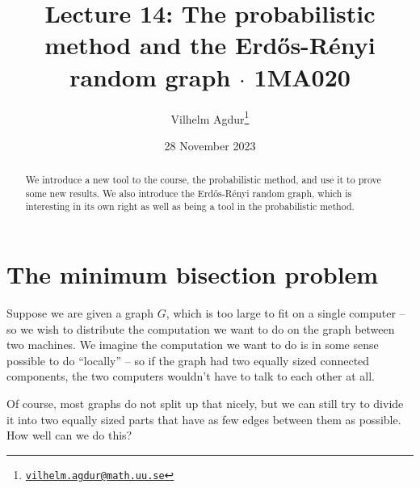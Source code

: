 \documentclass[nobib]{tufte-handout}
\title{Lecture 14: The probabilistic method and the Erd\H{o}s-Rényi random graph $\cdot$ 1MA020}
\author[Vilhelm Agdur]{Vilhelm Agdur\thanks{\href{mailto:vilhelm.agdur@math.uu.se}{\nolinkurl{vilhelm.agdur@math.uu.se}}}}
\date{28 November 2023}
\begin{document}
\maketitle%

\begin{abstract}
\noindent
We introduce a new tool to the course, the probabilistic method, and use it to prove some new results. We also introduce the Erd\H{o}s-Rényi random graph, which is interesting in its own right as well as being a tool in the probabilistic method.
\end{abstract}

\section{The minimum bisection problem}

Suppose we are given a graph $G$, which is too large to fit on a single computer -- so we wish to distribute the computation we want to do on the graph between two machines. We imagine the computation we want to do is in some sense possible to do ``locally'' -- so if the graph had two equally sized connected components, the two computers wouldn't have to talk to each other at all.

Of course, most graphs do not split up that nicely, but we can still try to divide it into two equally sized parts that have as few edges between them as possible. How well can we do this?
\end{document}
